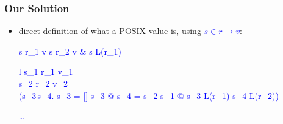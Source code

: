 \documentclass[dvipsnames,14pt,t]{beamer}
\newcommand{\bl}[1]{\textcolor{blue}{#1}}
\begin{document}
\begin{frame}[c]
\frametitle{Our Solution}

\begin{itemize}
\item direct definition of what a POSIX value is, using
\bl{$s \in r \to v$}:

\begin{center}
\bl{}\hspace{15mm}
\bl{}\bigskip\medskip

\bl{
          {s \in r_1 \to v}}\hspace{10mm}
\bl{
          {s \in r_2 \to v & s \not\in L(r_1)}}\bigskip\medskip

\bl{
          {\small\begin{array}{l}
           s_1 \in r_1 \to v_1 \\
           s_2 \in r_2 \to v_2 \\
           \neg(\exists s_3\,s_4.\; s_3 \not= []
           \wedge s_3 @ s_4 = s_2 \wedge
           s_1 @ s_3 \in L(r_1) \wedge
           s_4 \in L(r_2))
           \end{array}}}
           
\bl{\ldots}           
\end{center}
\end{itemize}

\end{frame}
\end{document}
